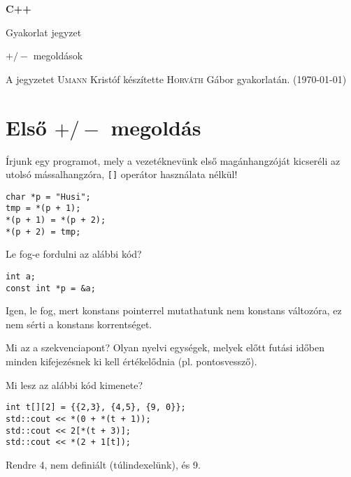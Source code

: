 \documentclass[a4paper,11.5pt]{article}
\begin{document}
	\setlength\parindent{0pt}
	\def\s{\hspace{0.2mm}\vphantom{\beta}}
	\def\Z{\mathbb{Z}}
	\def\Q{\mathbb{Q}}
	\def\R{\mathbb{R}}
	\def\C{\mathbb{C}}
	\def\N{\mathbb{N}}
	\def\Ra{\overline{\mathbb{R}}}
	
	\def\sume{\displaystyle\sum_{n=1}^{+\infty}}
	\def\sumn{\displaystyle\sum_{n=0}^{+\infty}}
	
	\def\narrow{\underset{n\rightarrow+\infty}{\longrightarrow}}
	\def\limn{\displaystyle\lim_{n\to +\infty}}
	\def\limx{\displaystyle\lim_{x\to +\infty}}
	
	\theoremstyle{definition}
	\newtheorem{theorem}{Tétel}[subsection] 
	
	\theoremstyle{definition}
	\newtheorem{definition}[theorem]{Definíció} 
	\newtheorem{example}[theorem]{Példa} 
	\newtheorem{task}[theorem]{Feladat} 
	\newtheorem{note}[theorem]{Megjegyzés}
	\begin{center}
		{\LARGE\textbf{C++}}
		
		{\Large Gyakorlat jegyzet}
		
		$+/-$ megoldások
	\end{center}A jegyzetet \textsc{Umann} Kristóf készítette \textsc{Horváth} Gábor gyakorlatán. (\today)
	\section{Első $+/-$ megoldás}
	Írjunk egy programot, mely a vezetéknevünk első magánhangzóját kicseréli az utolsó mássalhangzóra, \texttt{[]} operátor használata nélkül!
	\begin{lstlisting}
char *p = "Husi";
tmp = *(p + 1);
*(p + 1) = *(p + 2);
*(p + 2) = tmp;
	\end{lstlisting}
	Le fog-e fordulni az alábbi kód?
	\begin{lstlisting}
int a;
const int *p = &a;
	\end{lstlisting}
	Igen, le fog, mert konstans pointerrel mutathatunk nem konstans változóra, ez nem sérti a konstans korrentséget.
	
	\medskip
	Mi az a szekvenciapont? Olyan nyelvi egységek, melyek előtt futási időben minden kifejezésnek ki kell értékelődnia (pl. pontosvessző).
	
	\medskip
	Mi lesz az alábbi kód kimenete?
	\begin{lstlisting}
int t[][2] = {{2,3}, {4,5}, {9, 0}};
std::cout << *(0 + *(t + 1));
std::cout << 2[*(t + 3)];
std::cout << *(2 + 1[t]);
	\end{lstlisting}
	Rendre 4, nem definiált (túlindexelünk), és 9.
\end{document}
